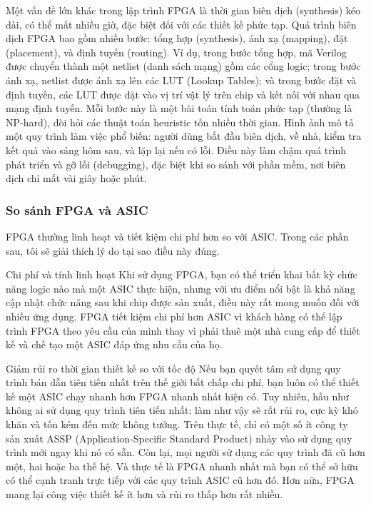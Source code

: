\documentclass[a4paper]{article}
\begin{document}
\begin{itemize}
    Một vấn đề lớn khác trong lập trình FPGA là thời gian biên dịch (synthesis) kéo dài, có thể mất nhiều giờ, đặc biệt đối với các thiết kế phức tạp. Quá trình biên dịch FPGA bao gồm nhiều bước: tổng hợp (synthesis), ánh xạ (mapping), đặt (placement), và định tuyến (routing). Ví dụ, trong bước tổng hợp, mã Verilog được chuyển thành một netlist (danh sách mạng) gồm các cổng logic; trong bước ánh xạ, netlist được ánh xạ lên các LUT (Lookup Tables); và trong bước đặt và định tuyến, các LUT được đặt vào vị trí vật lý trên chip và kết nối với nhau qua mạng định tuyến. Mỗi bước này là một bài toán tính toán phức tạp (thường là NP-hard), đòi hỏi các thuật toán heuristic tốn nhiều thời gian. Hình ảnh mô tả một quy trình làm việc phổ biến: người dùng bắt đầu biên dịch, về nhà, kiểm tra kết quả vào sáng hôm sau, và lặp lại nếu có lỗi. Điều này làm chậm quá trình phát triển và gỡ lỗi (debugging), đặc biệt khi so sánh với phần mềm, nơi biên dịch chỉ mất vài giây hoặc phút.

\end{itemize}
\subsubsection{So sánh FPGA và ASIC}
FPGA thường linh hoạt và tiết kiệm chi phí hơn so với ASIC. Trong các phần sau, tôi sẽ giải thích lý do tại sao điều này đúng.

Chi phí và tính linh hoạt
Khi sử dụng FPGA, bạn có thể triển khai bất kỳ chức năng logic nào mà một ASIC thực hiện, nhưng với ưu điểm nổi bật là khả năng cập nhật chức năng sau khi chip được sản xuất, điều này rất mong muốn đối với nhiều ứng dụng. FPGA tiết kiệm chi phí hơn ASIC vì khách hàng có thể lập trình FPGA theo yêu cầu của mình thay vì phải thuê một nhà cung cấp để thiết kế và chế tạo một ASIC đáp ứng nhu cầu của họ.

Giảm rủi ro thời gian thiết kế so với tốc độ
Nếu bạn quyết tâm sử dụng quy trình bán dẫn tiên tiến nhất trên thế giới bất chấp chi phí, bạn luôn có thể thiết kế một ASIC chạy nhanh hơn FPGA nhanh nhất hiện có. Tuy nhiên, hầu như không ai sử dụng quy trình tiên tiến nhất: làm như vậy sẽ rất rủi ro, cực kỳ khó khăn và tốn kém đến mức không tưởng. Trên thực tế, chỉ có một số ít công ty sản xuất ASSP (Application-Specific Standard Product) nhảy vào sử dụng quy trình mới ngay khi nó có sẵn. Còn lại, mọi người sử dụng các quy trình đã cũ hơn một, hai hoặc ba thế hệ. Và thực tế là FPGA nhanh nhất mà bạn có thể sở hữu có thể cạnh tranh trực tiếp với các quy trình ASIC cũ hơn đó. Hơn nữa, FPGA mang lại công việc thiết kế ít hơn và rủi ro thấp hơn rất nhiều.
\end{document}

